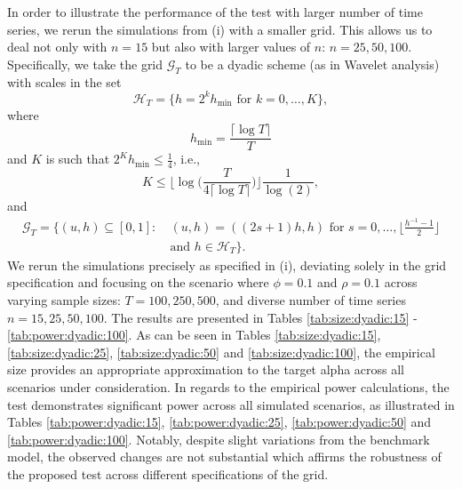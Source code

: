 \documentclass[a4paper,12pt]{article}
\begin{document}
In order to illustrate the performance of the test with larger number of time series, we rerun the simulations from (i) with a smaller grid. This allows us to deal not only with $n=15$ but also with larger values of $n$: $n=25, 50, 100$. Specifically, we take the grid $\mathcal{G}_T$ to be a dyadic scheme (as in Wavelet analysis) with scales in the set 
\[ \mathcal{H}_T = \big\{ h = 2^k h_{\min} \text{ for } k=0,\ldots,K \big\}, \]  
where 
\[ h_{\min} = \frac{\lceil \log T \rceil}{T} \]
and $K$ is such that $2^K h_{\min} \le \frac{1}{4}$, i.e.,
\[ K \le \Big\lfloor \log\Big(\frac{T}{4 \lceil \log T \rceil }\Big) \Big\rfloor \frac{1}{\log(2)}, \]
and 
\begin{align*}
\mathcal{G}_T = \big\{ (u,h) \subseteq [0,1]: & \ (u,h) = ((2s+1) h, h) \text{ for } s = 0,\ldots,\Big\lfloor \frac{h^ {-1}-1}{2} \Big\rfloor \\ & \ \text{and } h \in \mathcal{H}_T \big\}.
\end{align*}
We rerun the simulations precisely as specified in (i), deviating solely in the grid specification and focusing on the scenario where $\phi = 0.1$ and $\rho = 0.1$ across varying sample sizes: $T=100, 250, 500$, and diverse number of time series $n=15, 25, 50, 100$. The results are presented in Tables \ref{tab:size:dyadic:15} - \ref{tab:power:dyadic:100}. As can be seen in Tables \ref{tab:size:dyadic:15}, \ref{tab:size:dyadic:25}, \ref{tab:size:dyadic:50} and \ref{tab:size:dyadic:100}, the empirical size provides an appropriate approximation to the target alpha across all scenarios under consideration. In regards to the empirical power calculations, the test demonstrates significant power across all simulated scenarios, as illustrated in Tables \ref{tab:power:dyadic:15}, \ref{tab:power:dyadic:25}, \ref{tab:power:dyadic:50} and \ref{tab:power:dyadic:100}. Notably, despite slight variations from the benchmark model, the observed changes are not substantial which affirms the robustness of the proposed test across different specifications of the grid.
\end{document}

